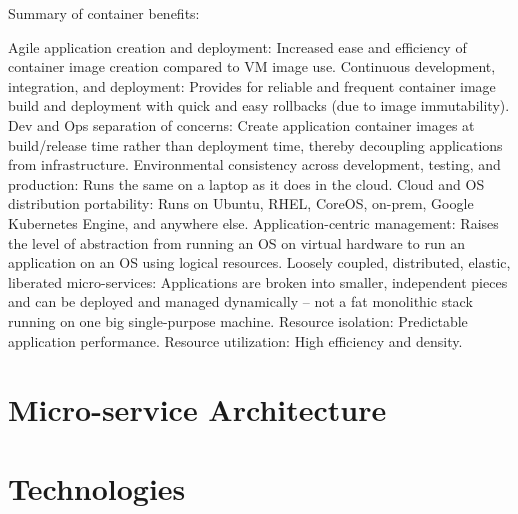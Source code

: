 Summary of container benefits:

Agile application creation and deployment: Increased ease and efficiency of container image creation compared to VM image use.
Continuous development, integration, and deployment: Provides for reliable and frequent container image build and deployment with quick and easy rollbacks (due to image immutability).
Dev and Ops separation of concerns: Create application container images at build/release time rather than deployment time, thereby decoupling applications from infrastructure.
Environmental consistency across development, testing, and production: Runs the same on a laptop as it does in the cloud.
Cloud and OS distribution portability: Runs on Ubuntu, RHEL, CoreOS, on-prem, Google Kubernetes Engine, and anywhere else.
Application-centric management: Raises the level of abstraction from running an OS on virtual hardware to run an application on an OS using logical resources.
Loosely coupled, distributed, elastic, liberated micro-services: Applications are broken into smaller, independent pieces and can be deployed and managed dynamically – not a fat monolithic stack running on one big single-purpose machine.
Resource isolation: Predictable application performance.
Resource utilization: High efficiency and density.


\section{Micro-service Architecture}
\label{sec:containers-orchestration-micro-service-architecture}



\section{Technologies}
\label{sec:containers-orchestration-technologies}

\lipsum[1]